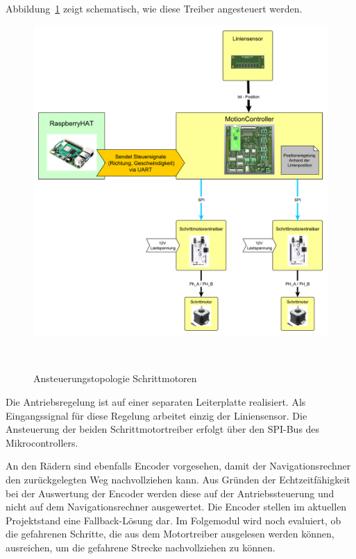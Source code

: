 \documentclass[main.tex]{subfiles} %
\begin{document}
Abbildung~\ref{Ansteuerungstopologie_Schrittmotorentreiber} zeigt schematisch,
wie diese Treiber angesteuert werden.

\begin{figure}[H]
    \centering
    \includegraphics[width = 1\linewidth]{fig_Antriebe_und_Dimensionierung/Konzept_Motoransteuerung.pdf}
    \caption{Ansteuerungstopologie Schrittmotoren}~\label{Ansteuerungstopologie_Schrittmotorentreiber}
\end{figure}

Die Antriebsregelung ist auf einer separaten Leiterplatte realisiert. Als
Eingangssignal für diese Regelung arbeitet einzig der Liniensensor. Die
Ansteuerung der beiden Schrittmotortreiber erfolgt über den SPI-Bus des
Mikrocontrollers.

An den Rädern sind ebenfalls Encoder vorgesehen, damit der Navigationsrechner
den zurückgelegten Weg nachvollziehen kann. Aus Gründen der Echtzeitfähigkeit
bei der Auswertung der Encoder werden diese auf der Antriebssteuerung und nicht
auf dem Navigationsrechner ausgewertet. Die Encoder stellen im aktuellen
Projektstand eine Fallback-Lösung dar. Im Folgemodul wird noch evaluiert, ob
die gefahrenen Schritte, die aus dem Motortreiber ausgelesen werden können,
ausreichen, um die gefahrene Strecke nachvollziehen zu können.
\end{document}
